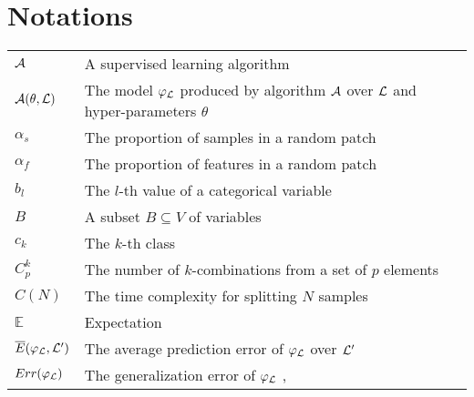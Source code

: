 
\chapter{Notations}
	
\begin{tabularx}{\textwidth}{ l X }
${\cal A}$ & A supervised learning algorithm \dotfill  \pageref{ntn:A}\\
${\cal A}(\theta, {\cal L})$ & The model $\varphi_{\cal L}$ produced by algorithm ${\cal A}$ over ${\cal L}$ and hyper-parameters $\theta$ \dotfill  \pageref{ntn:A-func}\\
$\alpha_s$ & The proportion of samples in a random patch \dotfill  \pageref{ntn:alpha_s}\\
$\alpha_f$ & The proportion of features in a random patch \dotfill  \pageref{ntn:alpha_f}\\
$b_l$ & The $l$-th value of a categorical variable \dotfill  \pageref{ntn:b_l}\\
$B$ & A subset $B \subseteq V$ of variables \dotfill  \pageref{ntn:B}\\
$c_k$ & The $k$-th class \dotfill  \pageref{ntn:c_k}\\
$C^k_p$ & The number of $k$-combinations from a set of $p$ elements \dotfill  \pageref{ntn:C_k_p}\\
$C(N)$ & The time complexity for splitting $N$ samples \dotfill  \pageref{ntn:cN}\\
$\mathbb{E}$ & Expectation \dotfill \\
$\overline{E}(\varphi_{\cal L}, {\cal L}^\prime)$ & The average prediction error of $\varphi_{\cal L}$ over ${\cal L}^\prime$ \dotfill  \pageref{ntn:E_bar}\\
$Err(\varphi_{\cal L})$ & The generalization error of $\varphi_{\cal L}$ \dotfill  \pageref{eqn:generalization-error}, \pageref{eqn:4:generalization-error}\\

\end{tabularx}
